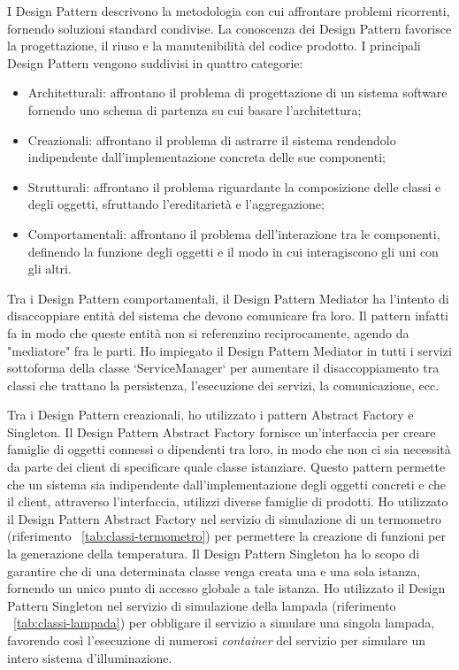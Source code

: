 I Design Pattern descrivono la metodologia con cui affrontare problemi ricorrenti, fornendo soluzioni standard condivise.
La conoscenza dei Design Pattern favorisce la progettazione, il riuso e la manutenibilità del codice prodotto.
I principali Design Pattern vengono suddivisi in quattro categorie:
\begin{itemize}
	\item Architetturali: affrontano il problema di progettazione di un sistema software fornendo uno schema di partenza su cui basare l’architettura;
	\item Creazionali: affrontano il problema di astrarre il sistema rendendolo indipendente dall’implementazione concreta delle sue componenti;
	\item Strutturali: affrontano il problema riguardante la composizione delle classi e degli oggetti, sfruttando l’ereditarietà e l’aggregazione;
	\item Comportamentali: affrontano il problema dell’interazione tra le componenti, definendo la funzione degli oggetti e il modo in cui interagiscono gli uni con gli altri.
\end{itemize}

Tra i Design Pattern comportamentali, il Design Pattern Mediator ha l'intento di disaccoppiare entità del sistema che devono comunicare fra loro. Il pattern infatti fa in modo che queste entità non si referenzino reciprocamente, agendo da "mediatore" fra le parti.
Ho impiegato il Design Pattern Mediator in tutti i servizi sottoforma della classe `ServiceManager` per aumentare il disaccoppiamento tra classi che trattano la persistenza, l'esecuzione dei servizi, la comunicazione, ecc.

Tra i Design Pattern creazionali, ho utilizzato i pattern Abstract Factory e Singleton.
Il Design Pattern Abstract Factory fornisce un'interfaccia per creare famiglie di oggetti connessi o dipendenti tra loro, in modo che non ci sia necessità da parte dei client di specificare quale classe istanziare. Questo pattern permette che un sistema sia indipendente dall'implementazione degli oggetti concreti e che il client, attraverso l'interfaccia, utilizzi diverse famiglie di prodotti.
Ho utilizzato il Design Pattern Abstract Factory nel servizio di simulazione di un termometro (riferimento ~\ref{tab:classi-termometro}) per permettere la creazione di funzioni per la generazione della temperatura.
Il Design Pattern Singleton ha lo scopo di garantire che di una determinata classe venga creata una e una sola istanza, fornendo un unico punto di accesso globale a tale istanza.
Ho utilizzato il Design Pattern Singleton nel servizio di simulazione della lampada (riferimento ~\ref{tab:classi-lampada}) per obbligare il servizio a simulare una singola lampada, favorendo così l'esecuzione di numerosi \emph{container} del servizio per simulare un intero sistema d'illuminazione.

